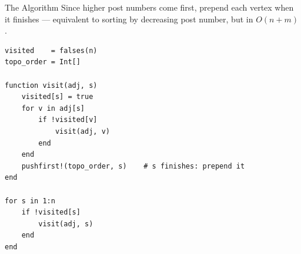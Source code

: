 \documentclass[10pt,aspectratio=169]{beamer}
\begin{document}
\begin{frame}[fragile]{The Algorithm}
  Since higher post numbers come first, prepend each vertex when it
  \alert{finishes} — equivalent to sorting by decreasing post number, but in $O(n + m)$.

\begin{lstlisting}[basicstyle=\ttfamily\scriptsize]
visited    = falses(n)
topo_order = Int[]

function visit(adj, s)
    visited[s] = true
    for v in adj[s]
        if !visited[v]
            visit(adj, v)
        end
    end
    pushfirst!(topo_order, s)    # s finishes: prepend it
end

for s in 1:n
    if !visited[s]
        visit(adj, s)
    end
end
\end{lstlisting}
\end{frame}
\end{document}
